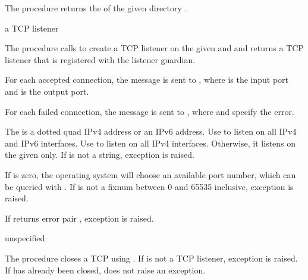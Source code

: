 The  procedure returns the
 of the given directory .

\begin{procedure}
\end{procedure}
\returns{} a TCP listener

The  procedure calls  to
create a TCP listener on the given  and 
and returns a TCP listener that is registered with the listener
guardian.

For each accepted connection, the message  is sent to , where
 is the input port and  is the output port.

For each failed connection, the message  is sent to ,
where  and  specify the error.

The  is a dotted quad IPv4 address or an IPv6
address. Use  to listen on all IPv4 and IPv6 interfaces.
Use  to listen on all IPv4 interfaces. Otherwise, it
listens on the given  only. If  is not a
string, exception  is
raised.

If  is zero, the operating system will choose an
available port number, which can be queried with
. If  is not a fixnum
between 0 and 65535 inclusive, exception  is raised.

If  returns error pair , exception  is raised.

\begin{procedure}
\end{procedure}
\returns{} unspecified

The  procedure closes a TCP
 using
.  If  is not a TCP
listener, exception  is raised. If  has already been
closed,  does not raise an exception.

